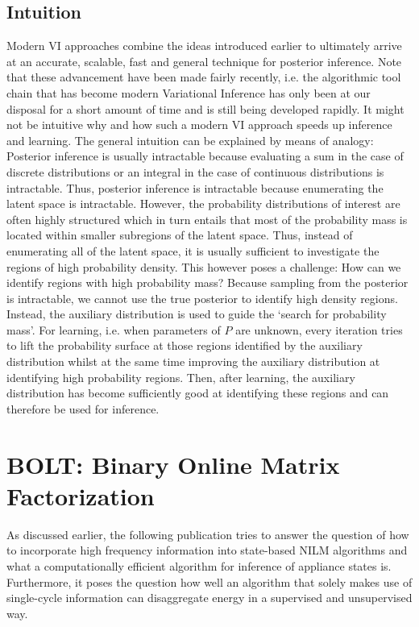\documentclass[11pt]{cmuthesis} %
\begin{document}
\section{Intuition}
Modern VI approaches combine the ideas introduced earlier to ultimately arrive at an accurate, scalable, fast and general technique for posterior inference. Note that these advancement have been made fairly recently, i.e. the algorithmic tool chain that has become modern Variational Inference has only been at our disposal for a short amount of time and is still being developed rapidly. It might not be intuitive why and how such a modern VI approach speeds up inference and learning. The general intuition can be explained by means of analogy: Posterior inference is usually intractable because evaluating a sum in the case of discrete distributions or an integral in the case of continuous distributions is intractable. Thus, posterior inference is intractable because enumerating the latent space is intractable. However, the probability distributions of interest are often highly structured which in turn entails that most of the probability mass is located within smaller subregions of the latent space. Thus, instead of enumerating all of the latent space, it is usually sufficient to investigate the regions of high probability density. This however poses a challenge: How can we identify regions with high probability mass? Because sampling from the posterior is intractable, we cannot use the true posterior to identify high density regions. Instead, the auxiliary distribution is used to guide the `search for probability mass'. For learning, i.e. when parameters of $P$ are unknown, every iteration tries to lift the probability surface at those regions identified by the auxiliary distribution whilst at the same time improving the auxiliary distribution at identifying high probability regions. Then, after learning, the auxiliary distribution has become sufficiently good at identifying these regions and can therefore be used for inference.


\newpage
\chapter{BOLT: Binary Online Matrix Factorization}
\label{chapter:bolt}

As discussed earlier, the following publication tries to answer the question of how to incorporate high frequency information into state-based NILM algorithms and what a computationally efficient algorithm for inference of appliance states is. Furthermore, it poses the question how well an algorithm that solely makes use of single-cycle information can disaggregate energy in a supervised and unsupervised way.\\
\end{document}
